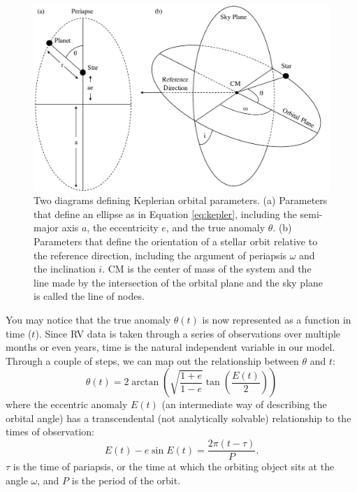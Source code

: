 \begin{figure}
    \centering
    \includegraphics[width=\textwidth]{figures-1/kepler.pdf}
    \caption[Keplerian orbital parameters]{Two diagrams defining Keplerian orbital parameters. (a) Parameters that define an ellipse as in Equation \ref{eq:kepler}, including the semi-major axis $a$, the eccentricity $e$, and the true anomaly $\theta$. (b) Parameters that define the orientation of a stellar orbit relative to the reference direction, including the argument of periapsis $\omega$ and the inclination $i$. CM is the center of mass of the system and the line made by the intersection of the orbital plane and the sky plane is called the line of nodes.}
    \label{fig:kepler}
\end{figure}

You may notice that the true anomaly $\theta(t)$ is now represented as a function in time ($t$). Since RV data is taken through a series of observations over multiple months or even years, time is the natural independent variable in our model. Through a couple of steps, we can map out the relationship between $\theta$ and $t$:
\begin{equation}
    \theta(t) = 2 \arctan{\left(\sqrt{\frac{1+e}{1-e}}\tan{\left(\frac{E(t)}{2}\right)}\right)}
    \label{eq:mean-anomaly}
\end{equation}
where the eccentric anomaly $E(t)$ (an intermediate way of describing the orbital angle) has a transcendental (not analytically solvable) relationship to the times of observation:
\begin{equation}
    E(t) - e \sin{E(t)} = \frac{2\pi (t - \tau)}{P}.
    \label{eq:eccentric-anomaly}
\end{equation}
$\tau$ is the time of pariapsis, or the time at which the orbiting object sits at the angle $\omega$, and $P$ is the period of the orbit.

